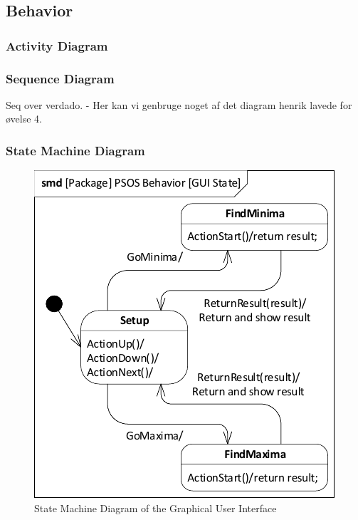 \subsection{Behavior} \label{requirementspecification:Behavior}

\subsubsection{Activity Diagram}

\subsubsection{Sequence Diagram}
Seq over verdado. - Her kan vi genbruge noget af det diagram henrik lavede for øvelse 4.
\subsubsection{State Machine Diagram}

\begin{figure}
	\centering
	\includegraphics[width=0.7\linewidth]{diagram/smd_gui_state}
	\caption{State Machine Diagram of the Graphical User Interface}
	\label{fig:smdguistate}
\end{figure}
